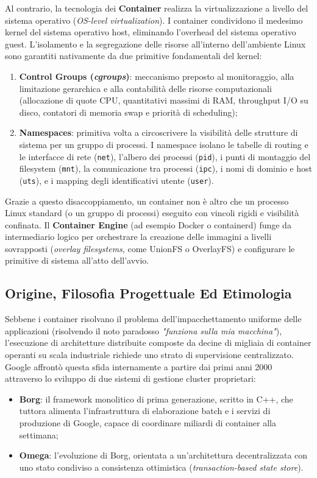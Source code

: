 \documentclass[11pt, a4paper]{article}
\begin{document}
Al contrario, la tecnologia dei \textbf{Container} realizza la virtualizzazione a livello del sistema operativo (\emph{OS-level virtualization}). I container condividono il medesimo kernel del sistema operativo host, eliminando l'overhead del sistema operativo guest. L'isolamento e la segregazione delle risorse all'interno dell'ambiente Linux sono garantiti nativamente da due primitive fondamentali del kernel:
\begin{enumerate}[noitemsep]
    \item \textbf{Control Groups (\emph{cgroups})}: meccanismo preposto al monitoraggio, alla limitazione gerarchica e alla contabilità delle risorse computazionali (allocazione di quote CPU, quantitativi massimi di RAM, throughput I/O su disco, contatori di memoria swap e priorità di scheduling);
    \item \textbf{Namespaces}: primitiva volta a circoscrivere la visibilità delle strutture di sistema per un gruppo di processi. I namespace isolano le tabelle di routing e le interfacce di rete (\texttt{net}), l'albero dei processi (\texttt{pid}), i punti di montaggio del filesystem (\texttt{mnt}), la comunicazione tra processi (\texttt{ipc}), i nomi di dominio e host (\texttt{uts}), e i mapping degli identificativi utente (\texttt{user}).
\end{enumerate}

Grazie a questo disaccoppiamento, un container non è altro che un processo Linux standard (o un gruppo di processi) eseguito con vincoli rigidi e visibilità confinata. Il \textbf{Container Engine} (ad esempio Docker o containerd) funge da intermediario logico per orchestrare la creazione delle immagini a livelli sovrapposti (\emph{overlay filesystems}, come UnionFS o OverlayFS) e configurare le primitive di sistema all'atto dell'avvio.

\subsection{Origine, Filosofia Progettuale Ed Etimologia}
Sebbene i container risolvano il problema dell'impacchettamento uniforme delle applicazioni (risolvendo il noto paradosso \emph{"funziona sulla mia macchina"}), l'esecuzione di architetture distribuite composte da decine di migliaia di container operanti su scala industriale richiede uno strato di supervisione centralizzato. Google affrontò questa sfida internamente a partire dai primi anni 2000 attraverso lo sviluppo di due sistemi di gestione cluster proprietari:
\begin{itemize}[noitemsep]
    \item \textbf{Borg}: il framework monolitico di prima generazione, scritto in C++, che tuttora alimenta l'infrastruttura di elaborazione batch e i servizi di produzione di Google, capace di coordinare miliardi di container alla settimana;
    \item \textbf{Omega}: l'evoluzione di Borg, orientata a un'architettura decentralizzata con uno stato condiviso a consistenza ottimistica (\emph{transaction-based state store}).
\end{itemize}
\end{document}
